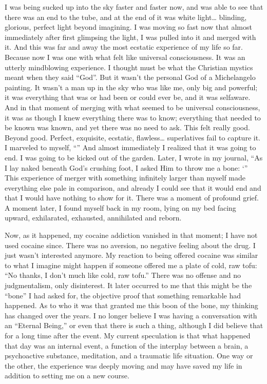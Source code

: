 \documentclass[a5paper,10pt,english]{book}
\begin{document}
\sphinxAtStartPar
I was being sucked up into the sky faster and faster now, and was able
to see that there was an end to the tube, and at the end of it was white
light… blinding, glorious, perfect light beyond imagining. I was moving
so fast now that almost immediately after first glimpsing the light, I
was pulled into it and merged with it. And this was far and away the
most ecstatic experience of my life so far. Because now I was one with
what felt like universal consciousness. It was an utterly mind\sphinxhyphen{}blowing
experience. I thought  must be what the Christian mystics meant
when they said “God”. But it wasn’t the personal God of a Michelangelo
painting. It wasn’t a man up in the sky who was like me, only big and
powerful; it was everything that was or had been or could ever be, and
it was self\sphinxhyphen{}aware. And in that moment of merging with what seemed to be
universal consciousness, it was as though I knew everything there was to
know; everything that needed to be known was known, and yet there was no
need to ask. This felt really good. Beyond good. Perfect, exquisite,
ecstatic, flawless… superlatives fail to capture it. I marveled to
myself, “” And almost immediately I
realized that it was going to end. I was going to be kicked out of the
garden. Later, I wrote in my journal, “As I lay naked beneath God’s
crushing foot, I asked Him to throw me a bone: ‘” This experience of merger with something infinitely
larger than myself made everything else pale in comparison, and already
I could see that it would end and that I would have nothing to show for
it. There was a moment of profound grief. A moment later, I found myself
back in my room, lying on my bed facing upward, exhilarated, exhausted,
annihilated and reborn.

\sphinxAtStartPar
Now, as it happened, my cocaine addiction vanished in that moment; I
have not used cocaine since. There was no aversion, no negative feeling
about the drug. I just wasn’t interested anymore. My reaction to being
offered cocaine was similar to what I imagine might happen if someone
offered me a plate of cold, raw tofu: “No thanks, I don’t much like
cold, raw tofu.” There was no offense and no judgmentalism, only
disinterest. It later occurred to me that this might be the “bone” I had
asked for, the objective proof that something remarkable had happened.
As to who it was that granted me this boon of the bone, my thinking has
changed over the years. I no longer believe I was having a conversation
with an “Eternal Being,” or even that there is such a thing, although I
did believe that for a long time after the event. My current speculation
is that what happened that day was an internal event, a function of the
interplay between a brain, a psychoactive substance, meditation, and a
traumatic life situation. One way or the other, the experience was
deeply moving and may have saved my life in addition to setting me on a
new course.
\end{document}
